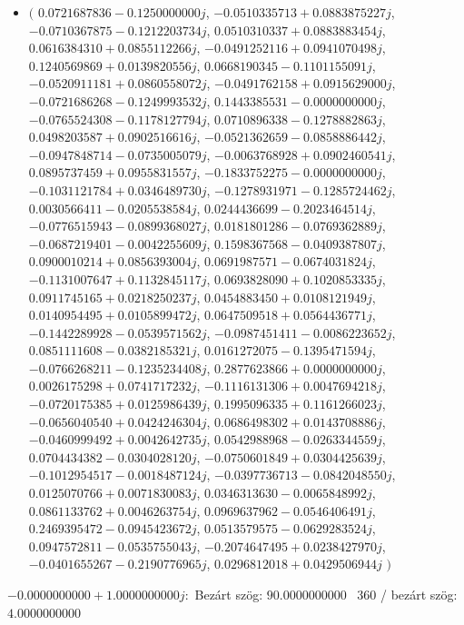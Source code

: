 \documentclass[14pt,a4paper]{article}
\begin{document}
\begin{itemize}
\item
$\big($
$0.0721687836-0.1250000000j$, $-0.0510335713+0.0883875227j$, $-0.0710367875-0.1212203734j$, $0.0510310337+0.0883883454j$, $0.0616384310+0.0855112266j$, $-0.0491252116+0.0941070498j$, $0.1240569869+0.0139820556j$, $0.0668190345-0.1101155091j$, $-0.0520911181+0.0860558072j$, $-0.0491762158+0.0915629000j$, $-0.0721686268-0.1249993532j$, $0.1443385531-0.0000000000j$, $-0.0765524308-0.1178127794j$, $0.0710896338-0.1278882863j$, $0.0498203587+0.0902516616j$, $-0.0521362659-0.0858886442j$, $-0.0947848714-0.0735005079j$, $-0.0063768928+0.0902460541j$, $0.0895737459+0.0955831557j$, $-0.1833752275-0.0000000000j$, $-0.1031121784+0.0346489730j$, $-0.1278931971-0.1285724462j$, $0.0030566411-0.0205538584j$, $0.0244436699-0.2023464514j$, $-0.0776515943-0.0899368027j$, $0.0181801286-0.0769362889j$, $-0.0687219401-0.0042255609j$, $0.1598367568-0.0409387807j$, $0.0900010214+0.0856393004j$, $0.0691987571-0.0674031824j$, $-0.1131007647+0.1132845117j$, $0.0693828090+0.1020853335j$, $0.0911745165+0.0218250237j$, $0.0454883450+0.0108121949j$, $0.0140954495+0.0105899472j$, $0.0647509518+0.0564436771j$, $-0.1442289928-0.0539571562j$, $-0.0987451411-0.0086223652j$, $0.0851111608-0.0382185321j$, $0.0161272075-0.1395471594j$, $-0.0766268211-0.1235234408j$, $0.2877623866+0.0000000000j$, $0.0026175298+0.0741717232j$, $-0.1116131306+0.0047694218j$, $-0.0720175385+0.0125986439j$, $0.1995096335+0.1161266023j$, $-0.0656040540+0.0424246304j$, $0.0686498302+0.0143708886j$, $-0.0460999492+0.0042642735j$, $0.0542988968-0.0263344559j$, $0.0704434382-0.0304028120j$, $-0.0750601849+0.0304425639j$, $-0.1012954517-0.0018487124j$, $-0.0397736713-0.0842048550j$, $0.0125070766+0.0071830083j$, $0.0346313630-0.0065848992j$, $0.0861133762+0.0046263754j$, $0.0969637962-0.0546406491j$, $0.2469395472-0.0945423672j$, $0.0513579575-0.0629283524j$, $0.0947572811-0.0535755043j$, $-0.2074647495+0.0238427970j$, $-0.0401655267-0.2190776965j$, $0.0296812018+0.0429506944j$
$\big)$
\end{itemize}
$-0.0000000000+1.0000000000j$:\
Bezárt szög: $90.0000000000$ \
360 / bezárt szög: $4.0000000000$\
\end{document}
